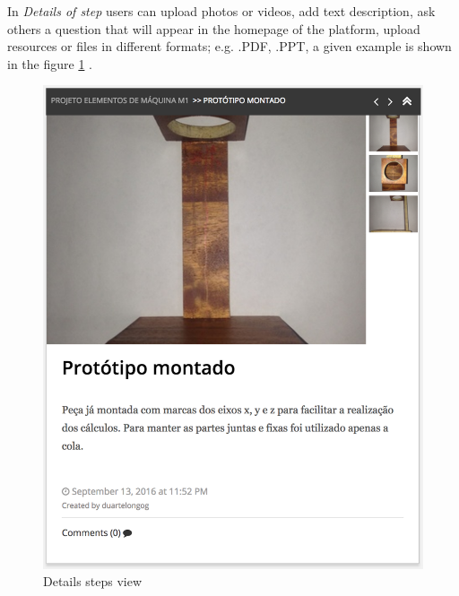 In \textit{Details of step} users can upload photos or videos, add text description, ask others a question that will appear in the homepage of the platform, upload resources or files in different formats; e.g. .PDF, .PPT, a given example is shown in the figure \ref{img-stepdetails} .
\begin{figure}[H]
	\centering
	\includegraphics[scale=.3]{./images/img-stepdetails.png}
	\caption{Details steps view} 
	\label{img-stepdetails}
\end{figure}

